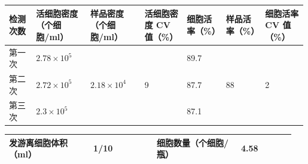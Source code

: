 \documentclass[UTF8,10pt,a4paper,fontset=fandol]{ctexart}
\newcommand{\fieldvalue}[1]{#1}
\newcommand{\handwritten}[1]{#1}
\begin{document}
\noindent
\small
\begin{tabular}{|p{0.09\linewidth}|p{0.18\linewidth}|p{0.18\linewidth}|p{0.14\linewidth}|p{0.13\linewidth}|p{0.13\linewidth}|p{0.14\linewidth}|}
\hline
检测次数 & 活细胞密度（个细胞/ml） & 样品密度（个细胞/ml） & 活细胞密度 CV 值（\%） & 细胞活率（\%） & 样品活率（\%） & 细胞活率 CV 值（\%）\\
\hline
第一次 &
\fieldvalue{\handwritten{$2.78\times10^5$}} &
&
&
\fieldvalue{\handwritten{89.7}} &
&
\\
\hline
第二次 &
\fieldvalue{\handwritten{$2.72\times10^5$}} &
\fieldvalue{\handwritten{$2.18\times10^4$}} &
\fieldvalue{\handwritten{9}} &
\fieldvalue{\handwritten{87.7}} &
\fieldvalue{\handwritten{88}} &
\fieldvalue{\handwritten{2}}\\
\hline
第三次 &
\fieldvalue{\handwritten{$2.3\times10^5$}} &
&
&
\fieldvalue{\handwritten{87.1}} &
&
\\
\hline
\end{tabular}
\normalsize

\vspace{0.4em}

\noindent
\begin{tabular}{|p{0.28\linewidth}|p{0.21\linewidth}|p{0.28\linewidth}|p{0.18\linewidth}|}
\hline
发游离细胞体积（ml） &
\fieldvalue{\handwritten{1/10}} &
细胞数量（个细胞/瓶） &
\fieldvalue{\handwritten{4.58}}\\
\hline
\end{tabular}

\vspace{0.3em}
\end{document}

